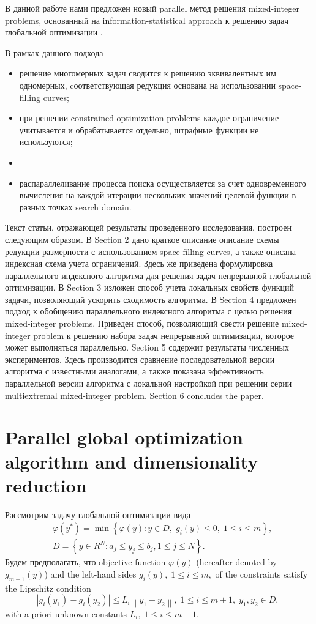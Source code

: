 \documentclass[
11pt,%
tightenlines,%
twoside,%
onecolumn,%
nofloats,%
nobibnotes,%
nofootinbib,%
superscriptaddress,%
noshowpacs,%
centertags]%
{revtex4}
\begin{document}
В данной работе нами предложен новый parallel метод решения mixed-integer problems, основанный на information-statistical approach к решению задач глобальной оптимизации \cite{Strongin2000,Strongin2013}. 

В рамках данного подхода 
\begin{itemize}
	\item 
	решение многомерных задач сводится  к решению эквивалентных им одномерных, cоответствующая редукция основана на использовании space-filling curves;
	\item 
	при решении constrained optimization problems каждое ограничение учитывается и обрабатывается отдельно, штрафные функции не используются;
	\item
	\item 
	распараллеливание процесса поиска осуществляется за счет одновременного вычисления на каждой итерации нескольких значений целевой функции в разных точках search domain.	
\end{itemize}

Текст статьи, отражающей результаты проведенного исследования, построен следующим образом. 
В Section 2 дано краткое описание описание схемы редукции размерности с использованием space-filling curves, а также описана индексная схема учета ограничений. Здесь же приведена формулировка параллельного индексного алгоритма для решения задач непрерывной глобальной оптимизации.
В Section 3 изложен способ учета локальных свойств функций задачи, позволяющий ускорить сходимость алгоритма.
В Section 4 предложен подход к обобщению параллельного индексного алгоритма с целью решения mixed-integer problems. Приведен способ, позволяющий свести решение mixed-integer problem к решению набора задач непрерывной оптимизации, которое может выполняться параллельно. 
Section 5 содержит результаты численных экспериментов. Здесь производится сравнение последовательной версии алгоритма с известными аналогами, а также показана эффективность параллельной версии алгоритма с локальной настройкой при решении серии multiextremal mixed-integer problem.  
Section 6 concludes the paper.



\section{Parallel global optimization algorithm and dimensionality reduction}

Рассмотрим задачу глобальной оптимизации вида
\begin{eqnarray}\label{problem}
&\varphi(y^\ast)=\min{\left\{\varphi(y):y\in D, \; g_i(y)\leq 0, \; 1 \leq i \leq m\right\}},\\
&D=\left\{y\in R^N: a_j\leq y_j \leq b_j, 1\leq j \leq N \right\}.\label{D}
\end{eqnarray}
Будем предполагать, что objective function $\varphi(y)$ (hereafter denoted by $g_{m+1}(y)$) and the left-hand sides $g_i(y), \; 1\leq i \leq m,$ of the constraints satisfy the Lipschitz condition 
\[
\left|g_i(y_1)-g_i(y_2)\right|\leq L_i\left\|y_1-y_2\right\|, \;1\leq i\leq m+1, \; y_1,y_2 \in D,\;
\]
with a priori unknown constants $L_i, \; 1 \leq i \leq m+1$. 
\end{document}
